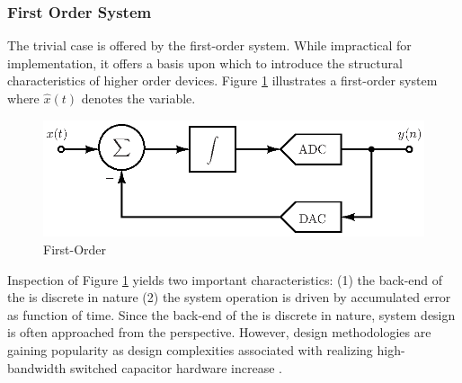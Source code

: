\subsubsection{First Order System}
The trivial case is offered by the first-order system. While impractical for
implementation, it offers a basis upon which to introduce the structural characteristics
of higher order devices. Figure \ref{fig:ct_first_order} illustrates a first-order \ct
system where $\hat{x}(t)$ denotes the \ct variable.
\begin{figure}[htbp]
 \centering
 \includegraphics{./final_figures/ct_dsm_model.eps}
 \caption{First-Order \CTDSM}
 \label{fig:ct_first_order}
\end{figure}
Inspection of Figure \ref{fig:ct_first_order} yields two important characteristics: (1)
the back-end of the \DSm is discrete in nature (2) the system operation is driven by
accumulated error as function of time. Since the back-end of the \DSm is discrete
in nature, system design is often approached from the \dt
perspective\cite{hayes_schaums_1998}. However, \ct design methodologies are gaining
popularity as design complexities associated with realizing high-bandwidth switched
capacitor hardware increase \cite{cherry_continuous-time_1999}.

